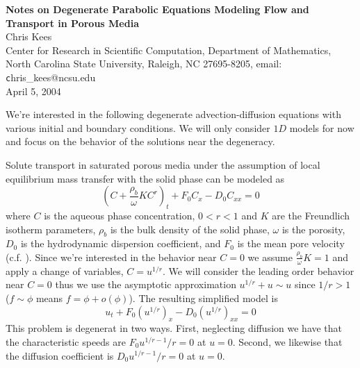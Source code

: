 \documentclass[10pt,dvips,twoside,reqno]{amsart}
\begin{document}
\begin{center}
{\bf Notes on Degenerate Parabolic Equations Modeling Flow and Transport in Porous Media \\}
Chris Kees\\
Center for Research in Scientific Computation, Department of Mathematics, North Carolina State University, Raleigh, NC 27695-8205, email: {\texttt chris\_kees@ncsu.edu} \\
April 5, 2004
\end{center}

We're interested in the following degenerate advection-diffusion
equations with various initial and boundary conditions. We will only
consider $1D$ models for now and focus on the behavior of the
solutions near the degeneracy.

 Solute transport in saturated porous media under the assumption of local equilibrium mass transfer with the solid phase can be modeled as
\begin{equation}
  \label{eq:react}
  (C + \frac{\rho_b}{\omega} K C^r)_t + F_0 C_x - D_0 C_{xx}  = 0 
\end{equation}
where $C$ is the aqueous phase concentration, $0<r<1$ and $K$ are the
Freundlich isotherm parameters, $\rho_b$ is the bulk density of the
solid phase, $\omega$ is the porosity, $D_0$ is the hydrodynamic
dispersion coefficient, and $F_0$ is the mean pore velocity (c.f.
\citep{Kanney_02}). Since we're interested in the behavior near
$C=0$ we assume $\frac{\rho_b}{\omega} K=1$ and apply a change of
variables, $C=u^{1/r}$. We will consider the leading order behavior
near $C=0$ thus we use the asymptotic approximation $u^{1/r} + u \sim
u$ since $1/r > 1$ ($f \sim \phi$ means $f = \phi + o(\phi)$). The
resulting simplified model is
\begin{equation}
  \label{eq:reactTrans}
  u_t + F_0(u^{1/r})_x - D_0 (u^{1/r})_{xx} = 0
\end{equation}
This problem is degenerat in two ways. First, neglecting diffusion we
have that the characteristic speeds are $F_0 u^{1/r -1}/r = 0$ at
$u=0$. Second, we likewise that the diffusion coefficient is $D_0
u^{1/r -1}/r =0$ at $u=0$.
\end{document}

